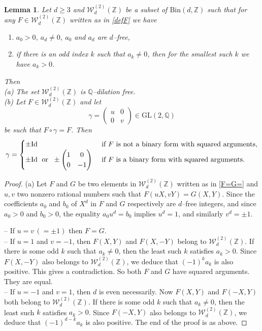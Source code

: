 \documentclass[10pt]{article}
\newtheorem{lemma}[theorem]{Lemma}
\theoremstyle{definition}
\numberwithin{equation}{section}
\newcommand {\Q}{{\mathbb{Q}}}
\newcommand {\Z}{{\mathbb{Z}}}
\newcommand{\Bin}{\mathrm {Bin}}
\newcommand{\GL}{\mathrm {GL}}
\begin{document}
 \begin{lemma}\label{Lemma:rigid}
 Let $d\geqslant 3$ and $\mathcal W_d^{(2)}(\Z)$ be a subset of $\Bin (d,\Z)$ such that for any $F\in \mathcal W_d^{(2)}(\Z)$ written as in \eqref{defF} we have
 \begin{enumerate}
 \item $a_0>0$, $a_d\not=0$, 
$a_0$ and $a_d$ are $d$--free,
 \item if there is an odd index $k$ such that $a_k\not=0$, then for the smallest such $k$ we have $a_k>0$.
 \end{enumerate}
 Then
 \\
 (a) The set $\mathcal W_d^{(2)}(\Z)$ is $\Q$--dilation free. 
 \\
 (b)
 Let $F\in \mathcal W_d^{(2)}(\Z)$ and let
\[
 \gamma = \begin{pmatrix} u& 0\\ 0 & v
\end{pmatrix} \in {\GL}(2, \Q)
\]
be such that $F\circ\gamma=F$. Then 
 \[
 \gamma = 
 \begin{cases} \pm {\rm Id} & \text{ if $F$ is not a binary form with squared arguments,}
 \\ 
\displaystyle \pm {\rm Id}\; \text { or } \; \pm \begin{pmatrix}1 & 0\\ 0 & -1 \end{pmatrix} &\text{ if $F$ is a binary form with squared arguments.}
 \end{cases}
 \]
 \end{lemma}
 
 \begin{proof}
 (a)
Let $F$ and $G$ be two elements in $\mathcal W_d^{(2)} (\Z)$ written as in \eqref{F=G=} and $u,v$ two nonzero rational numbers such that $F(uX,vY)=G(X,Y)$. Since the coefficients $a_0$ and $b_0$ of $X^d$ in $F$ and $G$ respectively are $d$--free integers, and since $a_0>0$ and $b_0>0$, the equality $a_0u^d=b_0$ implies $u^d=1$, and similarly $v^d= \pm 1$. 

\noindent
 -- If $u=v \, (=\pm 1)$ then $F=G$.
 \\
 -- If $u=1$ and $v=-1$, then $F(X,Y)$ and $F(X,-Y)$ belong to $\mathcal W_d^{(2)} (\Z)$. If there is some odd $k$ such that $a_k\neq 0$, then the least such $k$ satisfies $a_k>0$. Since $F(X,-Y)$ also belongs to $\mathcal W_d^{(2)} (\Z)$, we deduce that $(-1)^k a_k$ is also positive. This gives a contradiction. So both $F$ and $G$ have squared arguments. They are equal.
 \\
 -- If $u=-1$ and $v=1$, then $d$ is even necessarily. Now $F(X,Y)$ and $F(-X, Y)$ both belong to $\mathcal W_d^{(2)} (\Z)$. If there is some odd $k$ such that $a_k\neq 0$, then the least such $k$ satisfies $a_k>0$. Since $F(-X,Y)$ also belongs to $\mathcal W_d^{(2)} (\Z)$, we deduce that $(-1)^{d-k} a_k$ is also positive. The end of the proof is as above. 
 \end{proof}
 
\end{document}
